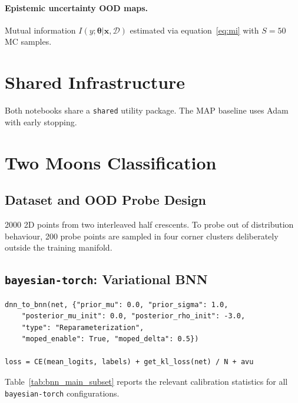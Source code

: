 \documentclass[12pt,a4paper]{article}
\newcommand{\btheta}{\bm{\theta}}
\newcommand{\cD}{\mathcal{D}}
\begin{document}
\paragraph{Epistemic uncertainty OOD maps.}
Mutual information $I(y;\btheta|\bm{x},\cD)$ estimated via
equation~\eqref{eq:mi} with $S=50$ MC samples.

\section{Shared Infrastructure}
\label{sec:shared}

Both notebooks share a \texttt{shared} utility package. The MAP baseline uses Adam with early stopping.

\section{Two Moons Classification}
\label{sec:twomoons}

\subsection{Dataset and OOD Probe Design}

2000 2D points from two interleaved half crescents.
To probe out of distribution behaviour, 200 probe points are
sampled in four corner clusters deliberately outside the training manifold.

\subsection{\texttt{bayesian-torch}: Variational BNN}
\label{sec:bnn}

\begin{lstlisting}[caption={BNN conversion and ELBO AvUC training.}]
dnn_to_bnn(net, {"prior_mu": 0.0, "prior_sigma": 1.0,
    "posterior_mu_init": 0.0, "posterior_rho_init": -3.0,
    "type": "Reparameterization",
    "moped_enable": True, "moped_delta": 0.5})

loss = CE(mean_logits, labels) + get_kl_loss(net) / N + avu
\end{lstlisting}

Table~\ref{tab:bnn_main_subset} reports the relevant calibration statistics for all \texttt{bayesian-torch} configurations.
\end{document}
